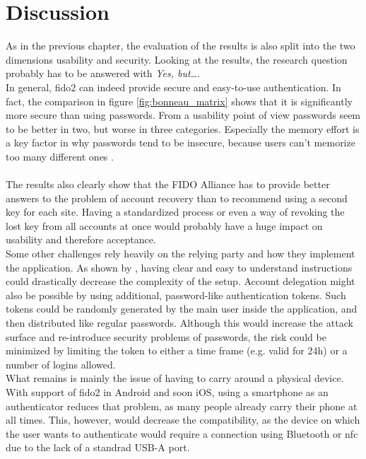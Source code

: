 
\section{Discussion}
\label{sec:discussion}

As in the previous chapter, the evaluation of the results is also split into the two dimensions usability and security.
Looking at the results, the research question probably has to be answered with \emph{Yes, but\dots}.\\
In general, \ac{fido2} can indeed provide secure and easy-to-use authentication. In fact, the comparison in figure \ref{fig:bonneau_matrix} shows that it is significantly more secure than using passwords. From a usability point of view passwords seem to be better in two, but worse in three categories. Especially the memory effort is a key factor in why passwords tend to be insecure, because users can't memorize too many different ones \cite{lyastani2018,elhai2016,whitty2015}.\\
\\
The results also clearly show that the FIDO Alliance has to provide better answers to the problem of account recovery than to recommend using a second key for each site. Having a standardized process or even a way of revoking the lost key from all accounts at once would probably have a huge impact on usability and therefore acceptance.\\
Some other challenges rely heavily on the relying party and how they implement the application. As shown by \cite{das2018}, having clear and easy to understand instructions could drastically decrease the complexity of the setup. Account delegation might also be possible by using additional, password-like authentication tokens. Such tokens could be randomly generated by the main user inside the application, and then distributed like regular passwords. Although this would increase the attack surface and re-introduce security problems of passwords, the risk could be minimized by limiting the token to either a time frame (e.g. valid for 24h) or a number of logins allowed.\\
What remains is mainly the issue of having to carry around a physical device. With support of \ac{fido2} in Android and soon iOS, using a smartphone as an authenticator reduces that problem, as many people already carry their phone at all times. This, however, would decrease the compatibility, as the device on which the user wants to authenticate would require a connection using Bluetooth or \ac{nfc} due to the lack of a standrad USB-A port.

